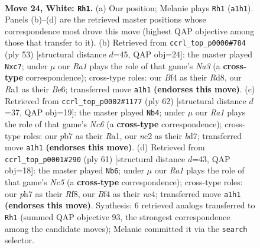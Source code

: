 \documentclass[11pt]{article}
\begin{document}
\clearpage

\begin{figure}[p]\centering
\begin{subfigure}{0.46\textwidth}\centering
\resizebox{\linewidth}{!}{%
\newchessgame
\chessboard[
  setfen={3k2r1/Nppnp2p/6p1/p7/5B1P/2P2P2/P1n1KP2/R7 w - - 1 24},
  showmover=false,
  pgfstyle=straightmove, color=movearrow, markmove={a1-h1}
]}
\caption{}
\end{subfigure}\hfill
\begin{subfigure}{0.46\textwidth}\centering
\resizebox{\linewidth}{!}{%
\newchessgame
\chessboard[
  setfen={3r2k1/ppN2ppp/n3b3/P7/8/6P1/1P2BP1P/2R3K1 b - - 0 27},
  showmover=false,
  pgfstyle=straightmove, color=movearrow, markmove={a6-c7}
]}
\caption{}
\end{subfigure}
\\[4pt]
\begin{subfigure}{0.46\textwidth}\centering
\resizebox{\linewidth}{!}{%
\newchessgame
\chessboard[
  setfen={5r2/p2b1kpp/PpN5/3p4/2nP1B2/2P5/5PP1/R5K1 w - - 3 32},
  showmover=false,
  pgfstyle=straightmove, color=movearrow, markmove={c6-b4}
]}
\caption{}
\end{subfigure}\hfill
\begin{subfigure}{0.46\textwidth}\centering
\resizebox{\linewidth}{!}{%
\newchessgame
\chessboard[
  setfen={5r1k/2p2ppp/8/1p6/1pnPN3/1P5P/5PP1/R5K1 b - - 0 31},
  showmover=false,
  pgfstyle=straightmove, color=movearrow, markmove={c4-b6}
]}
\caption{}
\end{subfigure}
\caption{\textbf{Move 24, White: \texttt{Rh1}.} (a) Our position; Melanie plays \texttt{Rh1} (\texttt{a1h1}). Panels (b)--(d) are the retrieved master positions whose correspondence most drove this move (highest QAP objective among those that transfer to it). (b) Retrieved from \texttt{ccrl\_top\_p0000\#784} (ply 53) [structural distance $d$=45, QAP obj=24]: the master played \texttt{Nxc7}; under $\mu$ our \emph{Ra1} plays the role of that game's \emph{Na3} (a \textbf{cross-type} correspondence); cross-type roles: our \emph{B}f4 as their \emph{R}d8, our \emph{R}a1 as their \emph{B}e6; transferred move \texttt{a1h1} \textbf{(endorses this move)}. (c) Retrieved from \texttt{ccrl\_top\_p0002\#1177} (ply 62) [structural distance $d$=37, QAP obj=19]: the master played \texttt{Nb4}; under $\mu$ our \emph{Ra1} plays the role of that game's \emph{Nc6} (a \textbf{cross-type} correspondence); cross-type roles: our \emph{p}b7 as their \emph{R}a1, our \emph{n}c2 as their \emph{b}d7; transferred move \texttt{a1h1} \textbf{(endorses this move)}. (d) Retrieved from \texttt{ccrl\_top\_p0001\#290} (ply 61) [structural distance $d$=43, QAP obj=18]: the master played \texttt{Nb6}; under $\mu$ our \emph{Ra1} plays the role of that game's \emph{Nc5} (a \textbf{cross-type} correspondence); cross-type roles: our \emph{p}h7 as their \emph{R}f8, our \emph{B}f4 as their \emph{n}e4; transferred move \texttt{a1h1} \textbf{(endorses this move)}. Synthesis: 6 retrieved analogs transferred to \texttt{Rh1} (summed QAP objective 93, the strongest correspondence among the candidate moves); Melanie committed it via the \texttt{search} selector.}
\label{fig:thought-m46}
\end{figure}
\end{document}
